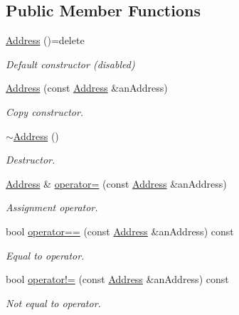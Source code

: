 \subsection*{Public Member Functions}
\begin{DoxyCompactItemize}
\item 
\hyperlink{classostk_1_1io_1_1ip_1_1_address_a4118f42388b11fb003c9fb782f4ca04f}{Address} ()=delete
\begin{DoxyCompactList}\small\item\em Default constructor (disabled) \end{DoxyCompactList}\item 
\hyperlink{classostk_1_1io_1_1ip_1_1_address_a003f6a3d8c0c53a27a72cbb7a5cabdca}{Address} (const \hyperlink{classostk_1_1io_1_1ip_1_1_address}{Address} \&an\+Address)
\begin{DoxyCompactList}\small\item\em Copy constructor. \end{DoxyCompactList}\item 
\hyperlink{classostk_1_1io_1_1ip_1_1_address_abd301573be1c4ea9f2dbed8556654304}{$\sim$\+Address} ()
\begin{DoxyCompactList}\small\item\em Destructor. \end{DoxyCompactList}\item 
\hyperlink{classostk_1_1io_1_1ip_1_1_address}{Address} \& \hyperlink{classostk_1_1io_1_1ip_1_1_address_a2154bcedb7622c8e1813e45efcdaaa95}{operator=} (const \hyperlink{classostk_1_1io_1_1ip_1_1_address}{Address} \&an\+Address)
\begin{DoxyCompactList}\small\item\em Assignment operator. \end{DoxyCompactList}\item 
bool \hyperlink{classostk_1_1io_1_1ip_1_1_address_ad5133a34558d6e70356d635429e2529b}{operator==} (const \hyperlink{classostk_1_1io_1_1ip_1_1_address}{Address} \&an\+Address) const
\begin{DoxyCompactList}\small\item\em Equal to operator. \end{DoxyCompactList}\item 
bool \hyperlink{classostk_1_1io_1_1ip_1_1_address_ae9cde5193e1957664d3c51b77d38f3f3}{operator!=} (const \hyperlink{classostk_1_1io_1_1ip_1_1_address}{Address} \&an\+Address) const
\begin{DoxyCompactList}\small\item\em Not equal to operator. \end{DoxyCompactList}\item 

\end{DoxyCompactItemize}
